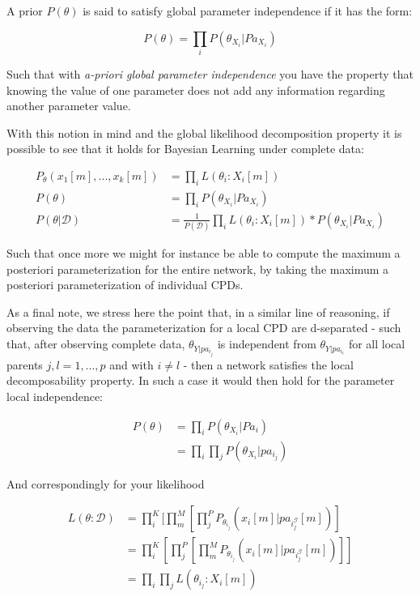 \documentclass[11pt]{article}
\begin{document}
\begin{article}
\begin{definition}
A prior $P(\theta)$ is said to satisfy global parameter independence
if it has the form:

$$P(\theta) = \prod_i P(\theta_{X_i}|Pa_{X_i})$$

\end{definition}  

Such that with \emph{a-priori global parameter independence} you have
the property that knowing the value of one parameter does not add
any information regarding another parameter value. 

With this notion in mind and the global likelihood decomposition
property it is possible to see that it holds for Bayesian Learning
under complete data:

\begin{align} \label{eq:bayes_learning_complete_data}
P_{\theta} (x_1[m], ..., x_k[m]) &= \prod_i L(\theta_i : X_i[m])  \nonumber \\
P(\theta) &= \prod_i P(\theta_{X_i}|Pa_{X_i})   \nonumber \\
P(\theta | \mathscr{D}) &= \frac{1}{P(\mathscr{D})} \prod_i L(\theta_i : X_i[m]) * P(\theta_{X_i}|Pa_{X_i}) \nonumber
\end{align}

Such that once more we might for instance be able to compute the
maximum a posteriori parameterization for the entire network, by
taking the maximum a posteriori parameterization of individual
CPDs.

As a final note, we stress here the point that, in a similar line
of reasoning, if observing the data the parameterization for a
local CPD are d-separated - such that, after observing complete
data, \(\theta_{Y|pa_i_j}\) is independent from \(\theta_{Y|pa_i_l}\)
for all local parents \(j,l = 1, ..., p\) and with \(i \neq l\) - then
a network satisfies the local decomposability property. In such a
case it would then hold for the parameter local independence:

\begin{align}
P(\theta) &= \prod_i P(\theta_{X_i}|Pa_i) \nonumber \\ 
          &= \prod_i \prod_j P(\theta_{X_i}|pa_i_j) \nonumber  
\end{align}

And correspondingly for your likelihood

\begin{align} 
L(\theta : \mathscr{D}) &= \prod_i^K [\prod_m^M [\prod_j^P  P_{\theta_i_j}(x_i[m] | pa_i_j^{\mathscr{G}}[m])] \nonumber \\
                        &= \prod_i^K [\prod_j^P [\prod_m^M  P_{\theta_i_j}(x_i[m] | pa_i_j^{\mathscr{G}}[m])]] \nonumber \\
                        &= \prod_i \prod_j L(\theta_i_j : X_i[m])  \nonumber
\end{align}


\end{article}
\end{document}

